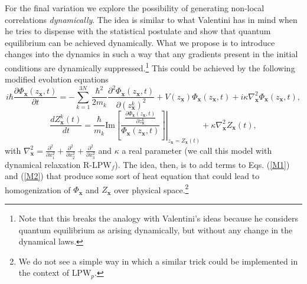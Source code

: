 \documentclass[letterpaper,12pt]{article}
\begin{document}
For the final variation we explore the possibility of generating non-local correlations \emph{dynamically}. The idea is similar to what Valentini has in mind when he tries to dispense with the statistical postulate and show that quantum equilibrium can be achieved dynamically. What we propose is to introduce changes into the dynamics in such a way that any gradients present in the initial conditions are dynamically suppressed.\footnote{Note that this breaks the analogy with Valentini's ideas because he considers quantum equilibrium as arising dynamically, but without any change in the dynamical laws.} This could be achieved
by the following modified evolution equations
 \begin{equation}\label{lap1}
 i \hbar \frac{\partial \Phi_\mathbf{x} (z_{\mathbf{x}},t)}{ \partial t } = - \sum_{k=1}^{3N} \frac{\hbar^2}{2 m_k} \frac{\partial^2 \Phi_\mathbf{x} (z_{\mathbf{x}},t)}{\partial (z^k_\mathbf{x})^2} + V(z_\mathbf{x})\Phi_\mathbf{x} (z_{\mathbf{x}},t) + i \kappa \nabla_\mathbf{x}^2 \Phi_\mathbf{x} (z_{\mathbf{x}},t) ,
 \end{equation}
\begin{equation}\label{lap2}
\frac{d Z^k_\mathbf{x}(t)}{dt} = \frac{\hbar}{m_k} \left. \text{Im}\left[ \frac{\frac{\partial \Phi_\mathbf{x} (z_{\mathbf{x}},t)}{\partial z^k_\mathbf{x} }}{ \Phi_\mathbf{x} (z_{\mathbf{x}},t)} \right] \right\rvert_{z_\mathbf{x}=Z_\mathbf{x}(t)} + \kappa \nabla_\mathbf{x}^2 Z_\mathbf{x}(t) ,
\end{equation}
with $\nabla_\mathbf{x}^2 = \frac{\partial^2}{\partial x_1^2}+\frac{\partial^2}{\partial x_2^2}+\frac{\partial^2}{\partial x_3^2}$ 
and $\kappa$ a real parameter (we call this model with dynamical relaxation $\text{R-LPW}_f$). The idea, then, is to add terms to Eqs. (\ref{M1}) and (\ref{M2}) that produce some sort of heat equation that could lead to homogenization of $\Phi_\mathbf{x}$ and $Z_\mathbf{x}$ over physical space.\footnote{We do not see a simple way in which a similar trick could be implemented in the context of $\text{LPW}_p$.}
\end{document}

